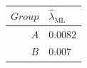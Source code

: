 \begin{tabularx}{\linewidth}{r>{\centering\arraybackslash}X}
\toprule  $Group$ & $\hat{\lambda}_\text{ML}$\\\midrule
  $A$ & $0.0082$\\\addlinespace
  $B$ & $0.007$\\\bottomrule
\end{tabularx}